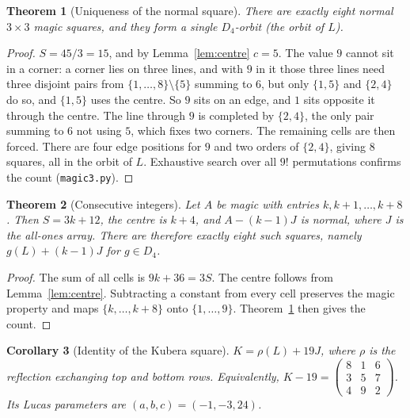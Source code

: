 \documentclass[pdflatex,sn-basic]{sn-jnl}
\theoremstyle{thmstyleone}
\newtheorem{theorem}{Theorem}
\newtheorem{corollary}[theorem]{Corollary}
\theoremstyle{thmstylethree}
\newcommand{\sq}[9]{\begin{smallmatrix}#1&#2&#3\\#4&#5&#6\\#7&#8&#9\end{smallmatrix}}
\begin{document}
\begin{theorem}[Uniqueness of the normal square]\label{thm:unique}
There are exactly eight normal $3\times3$ magic squares, and they form a single $D_4$-orbit (the orbit of $L$).
\end{theorem}
\begin{proof}
$S=45/3=15$, and by Lemma~\ref{lem:centre} $c=5$. The value $9$ cannot sit in a corner: a corner lies on three lines, and with $9$ in it those three lines need three disjoint pairs from $\{1,\dots,8\}\setminus\{5\}$ summing to $6$, but only $\{1,5\}$ and $\{2,4\}$ do so, and $\{1,5\}$ uses the centre. So $9$ sits on an edge, and $1$ sits opposite it through the centre. The line through $9$ is completed by $\{2,4\}$, the only pair summing to $6$ not using $5$, which fixes two corners. The remaining cells are then forced. There are four edge positions for $9$ and two orders of $\{2,4\}$, giving $8$ squares, all in the orbit of $L$. Exhaustive search over all $9!$ permutations confirms the count (\texttt{magic3.py}).
\end{proof}

\begin{theorem}[Consecutive integers]\label{thm:consec}
Let $A$ be magic with entries $k,k+1,\dots,k+8$. Then $S=3k+12$, the centre is $k+4$, and $A-(k-1)J$ is normal, where $J$ is the all-ones array. There are therefore exactly eight such squares, namely $g(L)+(k-1)J$ for $g\in D_4$.
\end{theorem}
\begin{proof}
The sum of all cells is $9k+36=3S$. The centre follows from Lemma~\ref{lem:centre}. Subtracting a constant from every cell preserves the magic property and maps $\{k,\dots,k+8\}$ onto $\{1,\dots,9\}$. Theorem~\ref{thm:unique} then gives the count.
\end{proof}

\begin{corollary}[Identity of the Kubera square]\label{cor:K}
$K=\rho(L)+19J$, where $\rho$ is the reflection exchanging top and bottom rows. Equivalently, $K-19=\left(\sq{8}{1}{6}{3}{5}{7}{4}{9}{2}\right)$. Its Lucas parameters are $(a,b,c)=(-1,-3,24)$.
\end{corollary}
\end{document}
